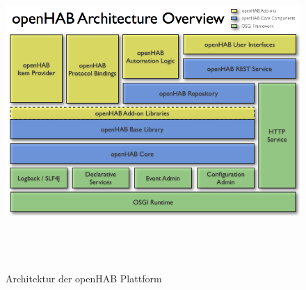     \begin{figure}[hbt!]
        \centering
        \includegraphics[width=12cm,height=12cm,keepaspectratio]{images/openhab-architecture.png}
        \caption{Architektur der openHAB Plattform \cite{openHAB-architecture2018}}
        \label{fig:architectureopenHAB}
    \end{figure}


